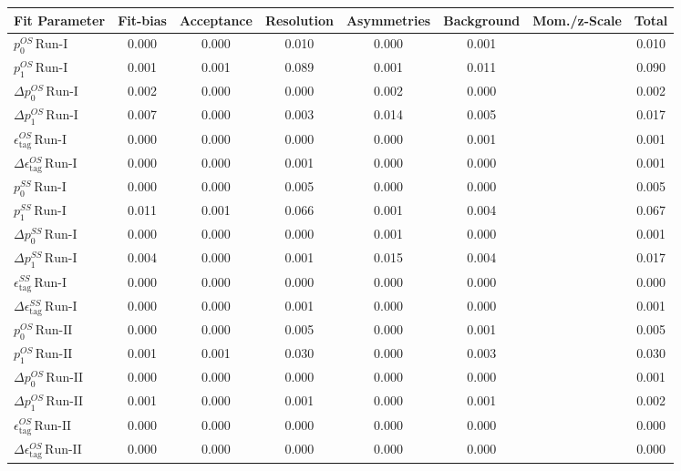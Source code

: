 \begin{tabular}{l  c  c  c  c  c  c  | c }
\hline
\hline
Fit Parameter & Fit-bias & Acceptance & Resolution & Asymmetries & Background & Mom./z-Scale &  Total  \\ 
\hline
$p_{0}^{OS} \, \text{Run-I}$ & 0.000 & 0.000 & 0.010 & 0.000 & 0.001 &  & 0.010 \\ 
$p_{1}^{OS} \, \text{Run-I}$ & 0.001 & 0.001 & 0.089 & 0.001 & 0.011 &  & 0.090 \\ 
$\Delta p_{0}^{OS} \, \text{Run-I}$ & 0.002 & 0.000 & 0.000 & 0.002 & 0.000 &  & 0.002 \\ 
$\Delta p_{1}^{OS} \, \text{Run-I}$ & 0.007 & 0.000 & 0.003 & 0.014 & 0.005 &  & 0.017 \\ 
$\epsilon_{\text{tag}}^{OS} \, \text{Run-I}$ & 0.000 & 0.000 & 0.000 & 0.000 & 0.001 &  & 0.001 \\ 
$\Delta \epsilon_{\text{tag}}^{OS} \, \text{Run-I}$ & 0.000 & 0.000 & 0.001 & 0.000 & 0.000 &  & 0.001 \\ 
$p_{0}^{SS} \, \text{Run-I}$ & 0.000 & 0.000 & 0.005 & 0.000 & 0.000 &  & 0.005 \\ 
$p_{1}^{SS} \, \text{Run-I}$ & 0.011 & 0.001 & 0.066 & 0.001 & 0.004 &  & 0.067 \\ 
$\Delta p_{0}^{SS} \, \text{Run-I}$ & 0.000 & 0.000 & 0.000 & 0.001 & 0.000 &  & 0.001 \\ 
$\Delta p_{1}^{SS} \, \text{Run-I}$ & 0.004 & 0.000 & 0.001 & 0.015 & 0.004 &  & 0.017 \\ 
$\epsilon_{\text{tag}}^{SS} \, \text{Run-I}$ & 0.000 & 0.000 & 0.000 & 0.000 & 0.000 &  & 0.000 \\ 
$\Delta \epsilon_{\text{tag}}^{SS} \, \text{Run-I}$ & 0.000 & 0.000 & 0.001 & 0.000 & 0.000 &  & 0.001 \\ 
$p_{0}^{OS} \, \text{Run-II}$ & 0.000 & 0.000 & 0.005 & 0.000 & 0.001 &  & 0.005 \\ 
$p_{1}^{OS} \, \text{Run-II}$ & 0.001 & 0.001 & 0.030 & 0.000 & 0.003 &  & 0.030 \\ 
$\Delta p_{0}^{OS} \, \text{Run-II}$ & 0.000 & 0.000 & 0.000 & 0.000 & 0.000 &  & 0.001 \\ 
$\Delta p_{1}^{OS} \, \text{Run-II}$ & 0.001 & 0.000 & 0.001 & 0.000 & 0.001 &  & 0.002 \\ 
$\epsilon_{\text{tag}}^{OS} \, \text{Run-II}$ & 0.000 & 0.000 & 0.000 & 0.000 & 0.000 &  & 0.000 \\ 
$\Delta \epsilon_{\text{tag}}^{OS} \, \text{Run-II}$ & 0.000 & 0.000 & 0.000 & 0.000 & 0.000 &  & 0.000 \\ 

\end{tabular}
